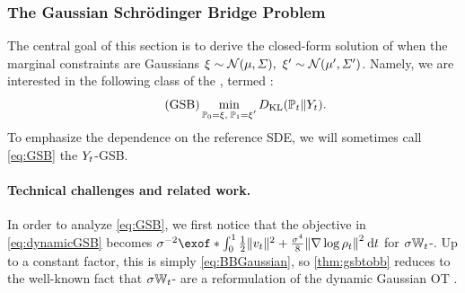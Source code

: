 \subsubsection{The Gaussian Schr\"odinger Bridge Problem}
\label{sec:tere}

The central goal of this section is to derive the closed-form solution of  when the marginal constraints are Gaussians $\xi \sim \mathcal{N}(\mu, \Sigma),\ \xi' \sim \mathcal{N}(\mu', \Sigma')$. Namely, we are interested in the following class of the , termed :%
\begin{equation}
\label{eq:GSB}
\tag{GSB}
\min_{ \substack{ \Pinit = \xi, \; \Pend = \xi'} } \KL( \Pmargin \| \refsde).%
\end{equation}
To emphasize the dependence on the reference \acrshort{SDE}, we will sometimes call \eqref{eq:GSB} the $Y_{ t }$-\acrshort{GSB}. 


%


\paragraph{Technical challenges and related work.} In order to analyze \eqref{eq:GSB}, we first notice that the objective in \eqref{eq:dynamicGSB} becomes $\sigma^{-2}\exof*{\int_{0}^\horizon  \frac{1}{2} \norm{\vect}^2 + \frac{\sigma^4}{8} \norm*{\nabla\log\measure}^2 \dt}$ for $\sigma\mathbb{W}_{t}$-. Up to a constant factor, this is simply \eqref{eq:BBGaussian}, so \cref{thm:gsbtobb} reduces to the well-known fact that $\sigma\mathbb{W}_{t}$- are a reformulation of the dynamic Gaussian \acrshort{OT} \citep{leonard2013survey, chen2016relation, gentil2017analogy}. 

